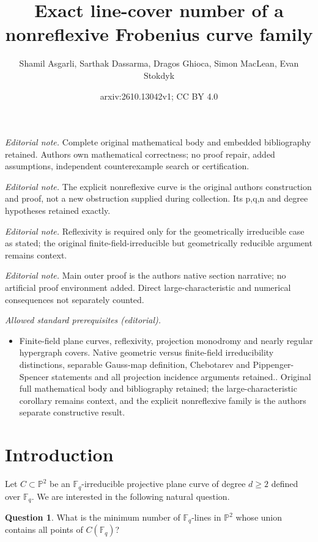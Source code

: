 \documentclass[10pt,a4paper]{amsart}
\title{Exact line-cover number of a nonreflexive Frobenius curve family}
\author{Shamil Asgarli, Sarthak Dassarma, Dragos Ghioca, Simon MacLean, Evan Stokdyk}
\date{arxiv:2610.13042v1; CC BY 4.0}
\theoremstyle{definition}
\newtheorem{question}[theorem]{Question}
\theoremstyle{remark}
\newcommand{\Fq}{\mathbb{F}_q}
\newcommand{\bP}{\mathbb{P}}
\begin{document}
\maketitle
\noindent\textit{Editorial note.} Complete original mathematical body and embedded bibliography retained. Authors own mathematical correctness; no proof repair, added assumptions, independent counterexample search or certification.\par\medskip
\noindent\textit{Editorial note.} The explicit nonreflexive curve is the original authors construction and proof, not a new obstruction supplied during collection. Its p,q,n and degree hypotheses retained exactly.\par\medskip
\noindent\textit{Editorial note.} Reflexivity is required only for the geometrically irreducible case as stated; the original finite-field-irreducible but geometrically reducible argument remains context.\par\medskip
\noindent\textit{Editorial note.} Main outer proof is the authors native section narrative; no artificial proof environment added. Direct large-characteristic and numerical consequences not separately counted.\par\medskip
\noindent\textit{Allowed standard prerequisites (editorial).}\begin{itemize}
\item Finite-field plane curves, reflexivity, projection monodromy and nearly regular hypergraph covers. Native geometric versus finite-field irreducibility distinctions, separable Gauss-map definition, Chebotarev and Pippenger-Spencer statements and all projection incidence arguments retained.. Original full mathematical body and bibliography retained; the large-characteristic corollary remains context, and the explicit nonreflexive family is the authors separate constructive result.
\end{itemize}\medskip
\section{Introduction}

Let $C \subset \bP^2$ be an $\Fq$-irreducible projective plane curve of degree $d\geq 2$ defined over $\Fq$. We are interested in the following natural question.

\begin{question}
What is the minimum number of $\Fq$-lines in $\bP^2$ whose union contains all points of $C(\Fq)$?
\end{question}
\end{document}
